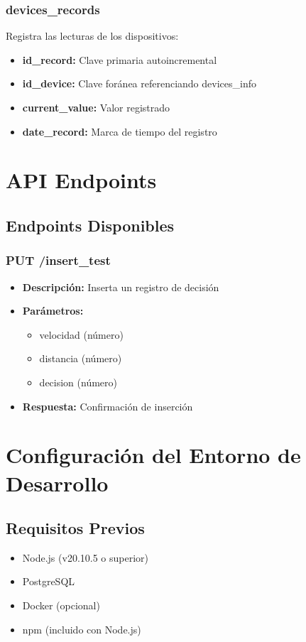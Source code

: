 \documentclass{article}
\begin{document}
\subsubsection{devices\_records}
Registra las lecturas de los dispositivos:
\begin{itemize}
    \item \textbf{id\_record:} Clave primaria autoincremental
    \item \textbf{id\_device:} Clave foránea referenciando devices\_info
    \item \textbf{current\_value:} Valor registrado
    \item \textbf{date\_record:} Marca de tiempo del registro
\end{itemize}

\section{API Endpoints}
\subsection{Endpoints Disponibles}

\subsubsection{PUT /insert\_test}
\begin{itemize}
    \item \textbf{Descripción:} Inserta un registro de decisión
    \item \textbf{Parámetros:}
    \begin{itemize}
        \item velocidad (número)
        \item distancia (número)
        \item decision (número)
    \end{itemize}
    \item \textbf{Respuesta:} Confirmación de inserción
\end{itemize}

\section{Configuración del Entorno de Desarrollo}

\subsection{Requisitos Previos}
\begin{itemize}
    \item Node.js (v20.10.5 o superior)
    \item PostgreSQL
    \item Docker (opcional)
    \item npm (incluido con Node.js)
\end{itemize}
\end{document}
